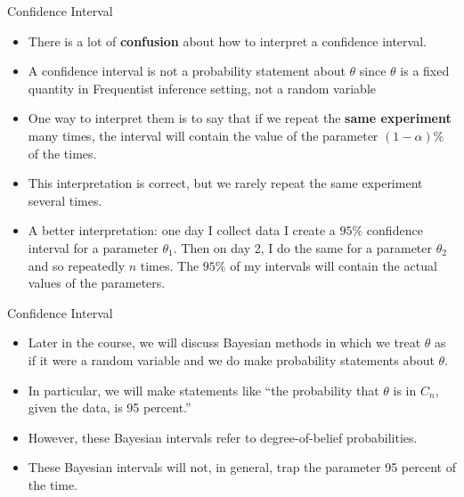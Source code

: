 \documentclass[handout]{beamer}
\begin{document}
\begin{frame}{Confidence Interval}
\scriptsize{


\begin{itemize}
 \item There is a lot of \textbf{confusion} about how to interpret a confidence interval.
 \item A confidence interval is not a probability statement about $\theta$ since $\theta$ is a fixed quantity in Frequentist inference setting, not a random variable
 \item One way to interpret them is to say that if we repeat the \textbf{same experiment} many times, the interval will contain the value of the parameter $(1-\alpha)\%$ of the times.
 \item This interpretation is correct, but we rarely repeat the same experiment several times.
 \item A better interpretation: one day I collect data I create a $95\%$ confidence interval for a parameter $\theta_1$. Then on day 2, I do the same for a parameter $\theta_2$ and so repeatedly $n$ times. The $95\%$ of my intervals will contain the actual values of the parameters. 
 
\end{itemize}



}
 
\end{frame}




\begin{frame}{Confidence Interval}
\scriptsize{


\begin{itemize}
 \item Later in the course, we will discuss Bayesian methods in which we treat $\theta$ as if it were a random variable and we do make probability statements about $\theta$.
\item In particular, we will make statements like ``the probability that $\theta$  is in $C_n$, given the data, is 95 percent.''
\item However, these Bayesian intervals refer to degree-of-belief probabilities. 
\item These Bayesian intervals will not, in general, trap the parameter 95 percent of the time.
 
\end{itemize}



}
 
\end{frame}
\end{document}
